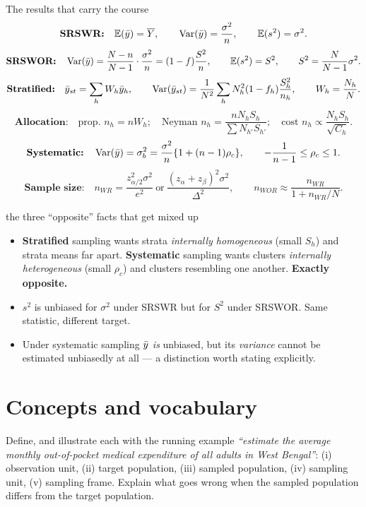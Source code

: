 \begin{note}{The results that carry the course}
\[
  \textbf{SRSWR:}\quad \mathbb{E}(\bar{y})=\overline{Y},\qquad \operatorname{Var}(\bar{y})=\frac{\sigma^2}{n},\qquad \mathbb{E}(s^2)=\sigma^2 .
\]
\[
  \textbf{SRSWOR:}\quad \operatorname{Var}(\bar{y})=\frac{N-n}{N-1}\cdot\frac{\sigma^2}{n}=(1-f)\frac{S^2}{n},
  \qquad \mathbb{E}(s^2)=S^2,\qquad S^2=\frac{N}{N-1}\sigma^2 .
\]
\[
  \textbf{Stratified:}\quad \bar{y}_{st}=\sum_h W_h\bar{y}_h,\qquad
  \operatorname{Var}(\bar{y}_{st})=\frac{1}{N^2}\sum_h N_h^2(1-f_h)\frac{S_h^2}{n_h},\qquad W_h=\frac{N_h}{N}.
\]
\[
  \textbf{Allocation:}\quad \text{prop. }n_h=nW_h;\quad \text{Neyman }n_h=\frac{nN_hS_h}{\sum N_{h'}S_{h'}};\quad
  \text{cost }n_h\propto\frac{N_hS_h}{\sqrt{C_h}} .
\]
\[
  \textbf{Systematic:}\quad \operatorname{Var}(\bar{y})=\sigma_b^2=\frac{\sigma^2}{n}\{1+(n-1)\rho_c\},
  \qquad -\frac{1}{n-1}\le\rho_c\le1 .
\]
\[
  \textbf{Sample size:}\quad n_{WR}=\frac{z^2_{\alpha/2}\sigma^2}{e^2}\ \text{or}\
  \frac{(z_\alpha+z_\beta)^2\sigma^2}{\Delta^2},\qquad
  n_{WOR}\approx\frac{n_{WR}}{1+n_{WR}/N}.
\]
\end{note}

\begin{trap}{the three ``opposite'' facts that get mixed up}
\begin{itemize}
  \item \textbf{Stratified} sampling wants strata \emph{internally homogeneous} (small $S_h$) and
        strata means far apart. \textbf{Systematic} sampling wants clusters \emph{internally
        heterogeneous} (small $\rho_c$) and clusters resembling one another. \textbf{Exactly
        opposite.}
  \item $s^2$ is unbiased for $\sigma^2$ under SRSWR but for $S^2$ under SRSWOR. Same statistic,
        different target.
  \item Under systematic sampling $\bar{y}$ \emph{is} unbiased, but its \emph{variance} cannot be
        estimated unbiasedly at all --- a distinction worth stating explicitly.
\end{itemize}
\end{trap}

\section{Concepts and vocabulary}

Define, and illustrate each with the running example \emph{``estimate the average monthly
out-of-pocket medical expenditure of all adults in West Bengal''}: (i) observation unit,
(ii) target population, (iii) sampled population, (iv) sampling unit, (v) sampling frame.
Explain what goes wrong when the sampled population differs from the target population.

